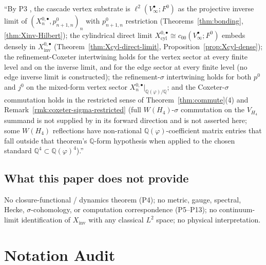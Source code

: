 \documentclass[11pt, a4paper]{amsart}
\theoremstyle{definition}
\newcommand{\Q}{\mathbb{Q}}
\newcommand{\inv}{\mathrm{inv}}
\newcommand{\cyl}{\mathrm{cyl}}
\begin{document}
``By P3 \cite{RefinementSpaces}, the cascade vertex substrate is
$\ell^2(V_\infty^\bullet; F^0)$ as the projective inverse limit
of $(X_n^{0, \bullet}, p_{n+1, n}^0)_n$ with $p_{n+1, n}^0$
restriction (Theorems~\ref{thm:bonding}, \ref{thm:Xinv-Hilbert});
the cylindrical direct limit $X_\cyl^{0, \bullet} \cong
c_{00}(V_\infty^\bullet; F^0)$ embeds densely in $X_\inv^{0,
\bullet}$ (Theorem~\ref{thm:Xcyl-direct-limit},
Proposition~\ref{prop:Xcyl-dense}); the refinement-Coxeter
intertwining holds for the vertex sector at every finite level
and on the inverse limit, and for the edge sector at every
finite level (no edge inverse limit is constructed); the
refinement-$\sigma$ intertwining holds for both $p^0$ and $j^0$
on the mixed-form vertex sector
$X_n^{0, \bullet}|_{\Q(\varphi)/\Q}$; and
the Coxeter-$\sigma$ commutation holds in the restricted sense of
Theorem~\ref{thm:commute}(4) and
Remark~\ref{rmk:coxeter-sigma-restricted} (full $W(H_4)$-$\sigma$
commutation on the $V_{H_4}$ summand is not supplied by
\cite[Theorem~\texttt{thm:pisigma-functorial}]{SigmaRationality}
in its forward direction and is not asserted here; some
$W(H_4)$ reflections have non-rational $\Q(\varphi)$-coefficient
matrix entries that fall outside that theorem's
$\Q$-form hypothesis when applied to the chosen standard
$\Q^4 \subset \Q(\varphi)^4$).''

\subsection{What this paper does not provide}

No closure-functional / dynamics theorem (P4); no metric, gauge,
spectral, Hecke, $\sigma$-cohomology, or computation
correspondence (P5--P13); no continuum-limit identification of
$X_\inv$ with any classical $L^2$ space; no physical interpretation.

\appendix

\section{Notation Audit}
\label{app:notation}
\end{document}
